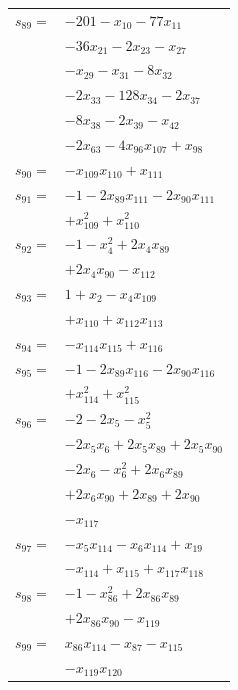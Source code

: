 \begin{longtable}{@{}r@{\;}l@{}}
\(s_{89}=\) & \(\displaystyle -201 -x_{10} -77x_{11}\) \\
 & \(\displaystyle -36x_{21} -2x_{23} -x_{27}\) \\
 & \(\displaystyle -x_{29} -x_{31} -8x_{32}\) \\
 & \(\displaystyle -2x_{33} -128x_{34} -2x_{37}\) \\
 & \(\displaystyle -8x_{38} -2x_{39} -x_{42}\) \\
 & \(\displaystyle -2x_{63} -4x_{96}x_{107} +x_{98}\) \\[3pt]
\(s_{90}=\) & \(\displaystyle -x_{109}x_{110} +x_{111}\) \\[3pt]
\(s_{91}=\) & \(\displaystyle -1 -2x_{89}x_{111} -2x_{90}x_{111}\) \\
 & \(\displaystyle +x_{109}^{2} +x_{110}^{2}\) \\[3pt]
\(s_{92}=\) & \(\displaystyle -1 -x_{4}^{2} +2x_{4}x_{89}\) \\
 & \(\displaystyle +2x_{4}x_{90} -x_{112}\) \\[3pt]
\(s_{93}=\) & \(\displaystyle 1 +x_{2} -x_{4}x_{109}\) \\
 & \(\displaystyle +x_{110} +x_{112}x_{113}\) \\[3pt]
\(s_{94}=\) & \(\displaystyle -x_{114}x_{115} +x_{116}\) \\[3pt]
\(s_{95}=\) & \(\displaystyle -1 -2x_{89}x_{116} -2x_{90}x_{116}\) \\
 & \(\displaystyle +x_{114}^{2} +x_{115}^{2}\) \\[3pt]
\(s_{96}=\) & \(\displaystyle -2 -2x_{5} -x_{5}^{2}\) \\
 & \(\displaystyle -2x_{5}x_{6} +2x_{5}x_{89} +2x_{5}x_{90}\) \\
 & \(\displaystyle -2x_{6} -x_{6}^{2} +2x_{6}x_{89}\) \\
 & \(\displaystyle +2x_{6}x_{90} +2x_{89} +2x_{90}\) \\
 & \(\displaystyle -x_{117}\) \\[3pt]
\(s_{97}=\) & \(\displaystyle -x_{5}x_{114} -x_{6}x_{114} +x_{19}\) \\
 & \(\displaystyle -x_{114} +x_{115} +x_{117}x_{118}\) \\[3pt]
\(s_{98}=\) & \(\displaystyle -1 -x_{86}^{2} +2x_{86}x_{89}\) \\
 & \(\displaystyle +2x_{86}x_{90} -x_{119}\) \\[3pt]
\(s_{99}=\) & \(\displaystyle x_{86}x_{114} -x_{87} -x_{115}\) \\
 & \(\displaystyle -x_{119}x_{120}\) \\[3pt]

\end{longtable}
